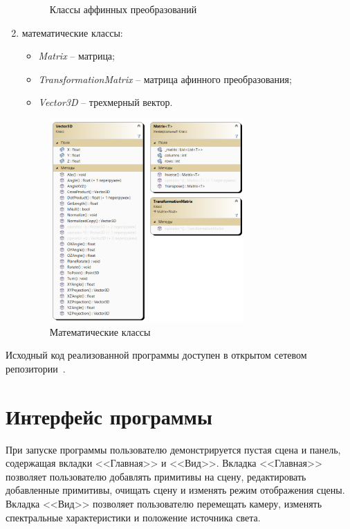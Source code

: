 \begin{enumerate}
\begin{figure}[h]
		\caption{Классы аффинных преобразований} 
		\label{fig:transformation-class} 
	\end{figure}
	\item математические классы:
	\begin{itemize}[label=--]
		\item \textit{Matrix} -- матрица;
		\item \textit{TransformationMatrix} -- матрица афинного преобразования;
		\item \textit{Vector3D} -- трехмерный вектор.
	\end{itemize}
	\begin{figure}[h] 
		\centering
		\includegraphics[width=0.7\textwidth]{images/math-class.png}
		\caption{Математические классы} 
		\label{fig:math-class} 
	\end{figure}
\end{enumerate}

Исходный код реализованной программы доступен в открытом сетевом репозитории~\cite{lit11}.

\section{Интерфейс программы}

При запуске программы пользователю демонстрируется пустая сцена и панель, содержащая вкладки <<Главная>> и <<Вид>>. Вкладка <<Главная>> позволяет пользователю добавлять примитивы на сцену, редактировать добавленные примитивы, очищать сцену и изменять режим отображения сцены. Вкладка <<Вид>> позволяет пользователю перемещать камеру, изменять спектральные характеристики и положение источника света.

